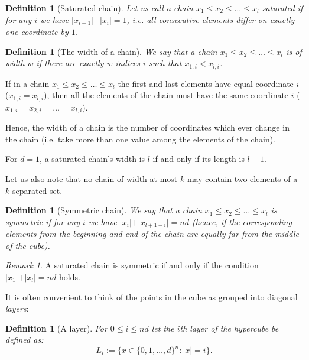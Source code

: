 \documentclass[11pt, reqno]{amsart}
\newcommand{\leanblueprintbase}{https://mj141592.github.io/weighted-chains-paper}
\newif\ifleanlinks
\newcommand{\leanblueprint}[1]{%
  \ifleanlinks
    \leavevmode\unskip\penalty9999\hbox{}\nobreak\hfill\quad
    \href{\leanblueprintbase/theorems/#1/}{%
      \mbox{\normalfont\footnotesize\textcolor{blue}{[\textsf{Lean formalisation}]}}}%
    \par\nobreak
  \fi
}
\newtheorem{definition}[theorem]{Definition}
\theoremstyle{remark}
\newtheorem*{remark}{Remark}
\numberwithin{equation}{section}
\newcommand{\thehypercube}{\{0, 1, \ldots, d\}^n}
\begin{document}
\begin{definition}[Saturated chain]
\label{wc:def:saturated-chain}
\label{saturated_definition}
    Let us call a chain $x_1 \leqslant x_2 \leqslant \ldots \leqslant x_l$ saturated if for any $i$ we have $\vert x_{i+1}\vert -\vert x_i\vert =1$, i.e. all consecutive elements differ on exactly one coordinate by $1$.
\leanblueprint{saturated-chain}
\end{definition}

\begin{definition}[The width of a chain]
\label{wc:def:chain-width}
    We say that a chain $x_1 \leqslant x_2 \leqslant \ldots \leqslant x_l$ is of width $w$ if there are exactly $w$ indices $i$ such that $x_{1,i} < x_{l, i}$.
\leanblueprint{chain-width}
\end{definition}

If in a chain $x_1 \leqslant x_2 \leqslant \ldots \leqslant x_l$ the first and last elements have equal coordinate $i$ ($x_{1,i}=x_{l,i}$), then all the elements of the chain must have the same coordinate $i$ ($x_{1, i} = x_{2, i} = \ldots = x_{l, i}$).

Hence, the width of a chain is the number of coordinates which ever change in the chain (i.e. take more than one value among the elements of the chain).

For $d=1$, a saturated chain's width is $l$ if and only if its length is $l+1$.

Let us also note that no chain of width at most $k$ may contain two elements of a $k$-separated set.

\begin{definition}[Symmetric chain]
\label{wc:def:symmetric-chain}
    We say that a chain $x_1 \leqslant x_2 \leqslant \ldots \leqslant x_l$ is symmetric if for any $i$ we have $\vert x_{i}\vert +\vert x_{l+1-i}\vert =nd$ (hence, if the corresponding elements from the beginning and end of the chain are equally far from the middle of the cube).
\leanblueprint{symmetric-chain}
\end{definition}

\begin{remark}
    A saturated chain is symmetric if and only if the condition $\vert x_1\vert +\vert x_l\vert =nd$ holds.
\end{remark}

It is often convenient to think of the points in the cube as grouped into diagonal \emph{layers}:

\begin{definition}[A layer]
\label{wc:def:layer}
    For $0 \leqslant i \leqslant nd$ let the $i$th layer of the hypercube be defined as:
    \begin{equation*}
        L_i := \{x \in \thehypercube: \vert x\vert =i\}.
    \end{equation*}
\leanblueprint{layer}
\end{definition}
\end{document}
